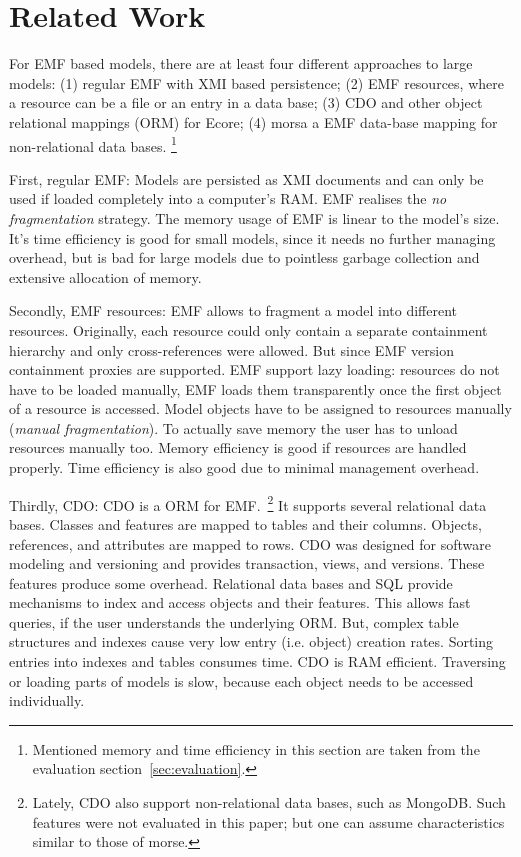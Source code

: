 \section{Related Work}
\label{sec:related_work}

For EMF based models, there are at least four different approaches to large models: (1) regular EMF with XMI based persistence; (2) EMF resources, where a resource can be a file or an entry in a data base; (3) CDO and other object relational mappings (ORM) for Ecore; (4) morsa a EMF data-base mapping for non-relational data bases.
\footnote{Mentioned memory and time efficiency in this section are taken from the evaluation section~\ref{sec:evaluation}.}

First, regular EMF: Models are persisted as XMI documents and can only be used if loaded completely into a computer's RAM. EMF realises the \emph{no fragmentation} strategy. The memory usage of EMF is linear to the model's size. It's time efficiency is good for small models, since it needs no further managing overhead, but is bad for large models due to pointless garbage collection and extensive allocation of memory.

Secondly, EMF resources: EMF allows to fragment a model into different resources. Originally, each resource could only contain a separate containment hierarchy and only cross-references were allowed. But since EMF version  containment proxies are supported. EMF support lazy loading: resources do not have to be loaded manually, EMF loads them transparently once the first object of a resource is accessed. Model objects have to be assigned to resources manually (\emph{manual fragmentation}). To actually save memory the user has to unload resources manually too. Memory efficiency is good if resources are handled properly. Time efficiency is also good due to minimal management overhead.

Thirdly, CDO: CDO is a ORM for EMF.~\footnote{Lately, CDO also support non-relational data bases, such as MongoDB. Such features were not evaluated in this paper; but one can assume characteristics similar to those of morse.}
It supports several relational data bases. Classes and features are mapped to tables and their columns. Objects, references, and attributes are mapped to rows. CDO was designed for software modeling and versioning and provides transaction, views, and versions. These features produce some overhead. 
Relational data bases and SQL provide mechanisms to index and access objects and their features. This allows fast queries, if the user understands the underlying ORM. But, complex table structures and indexes cause very low entry (i.e. object) creation rates. Sorting entries into indexes and tables consumes time.
CDO is RAM efficient. Traversing or loading parts of models is slow, because each object needs to be accessed individually. 

